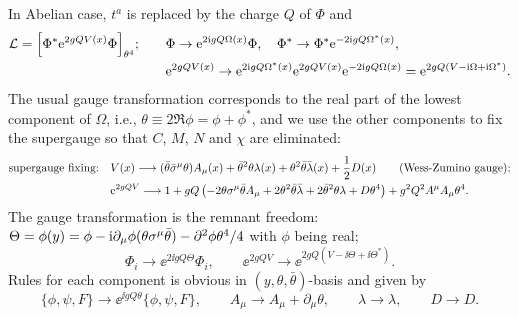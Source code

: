 \documentclass[CheatSheet]{subfiles}
\begin{document}
In Abelian case, $t^a$ is replaced by the charge $Q$ of $\Phi$ and
\begin{align}
  \mathcal L = \Bigl[\Phi^*{\mathrm{e}}^{2g Q V(x)}\Phi\Bigr]_{\theta^4};
\qquad
  &\Phi\to {\mathrm{e}}^{2{\mathrm{i}} g Q \Omega(x)}\Phi,
\quad
  \Phi^*\to \Phi^*{\mathrm{e}}^{-2{\mathrm{i}} g Q \Omega^*(x)},
\\
&{\mathrm{e}}^{2gQ V(x)}\to
{\mathrm{e}}^{2{\mathrm{i}} gQ \Omega^*(x)}
 {\mathrm{e}}^{2gQ V(x)}
{\mathrm{e}}^{-2{\mathrm{i}} gQ \Omega(x)}
={\mathrm{e}}^{2gQ\left(V-{\mathrm{i}}\Omega+{\mathrm{i}}\Omega^*\right)}.
\end{align}
The usual gauge transformation corresponds to the real part of the lowest component of $\Omega$, i.e., $\theta\equiv2\Re\phi=\phi+\phi^*$,
and we use the other components to fix the supergauge so that $C$, $M$, $N$ and $\chi$ are eliminated:
\begin{align}
 \text{supergauge fixing:}\quad &V(x)\longrightarrow(\bar\theta\bar\sigma^{\mu}\theta)A_{\mu}(x)+\bar\theta^2\theta\lambda(x)+\theta^2\bar\theta\bar{\lambda}(x)+\frac{1}{2}D(x)\qquad\text{(Wess-Zumino gauge)};\\
& {\mathrm{e}}^{2gQV}\longrightarrow
 1 +gQ\left(
  - 2\theta \sigma^{\mu}\bar\theta A_{\mu} +2\theta^2\bar\theta \bar\lambda+2\bar\theta^2\theta\lambda
  + D\theta^4
\right)
 +g^2Q^2A^\mu A_\mu\theta^4.
\end{align}
The gauge transformation is the remnant freedom:
 $\Theta= \phi(y)=\phi-{\mathrm{i}} \partial_{\mu}\phi (\theta \sigma^{\mu}\bar\theta)-\partial^2\phi \theta^4/4$ with $\phi$ being real;
\begin{equation}
 \Phi_i\to \ee^{2\ii gQ \Theta}\Phi_i,
\qquad
 \ee^{2gQ V}\to \ee^{2gQ (V-\ii\Theta+\ii\Theta^*)}.
\end{equation}
Rules for each component is obvious in $(y,\theta,\bar\theta)$-basis and given by
\begin{equation}
  \{\phi,\psi,F\}\to \ee^{\ii g Q \theta}\{\phi,\psi,F\},\qquad
  A_\mu\to A_\mu+\partial_\mu \theta,\qquad
  \lambda\to\lambda,\qquad
  D\to D.
\end{equation}
\end{document}
